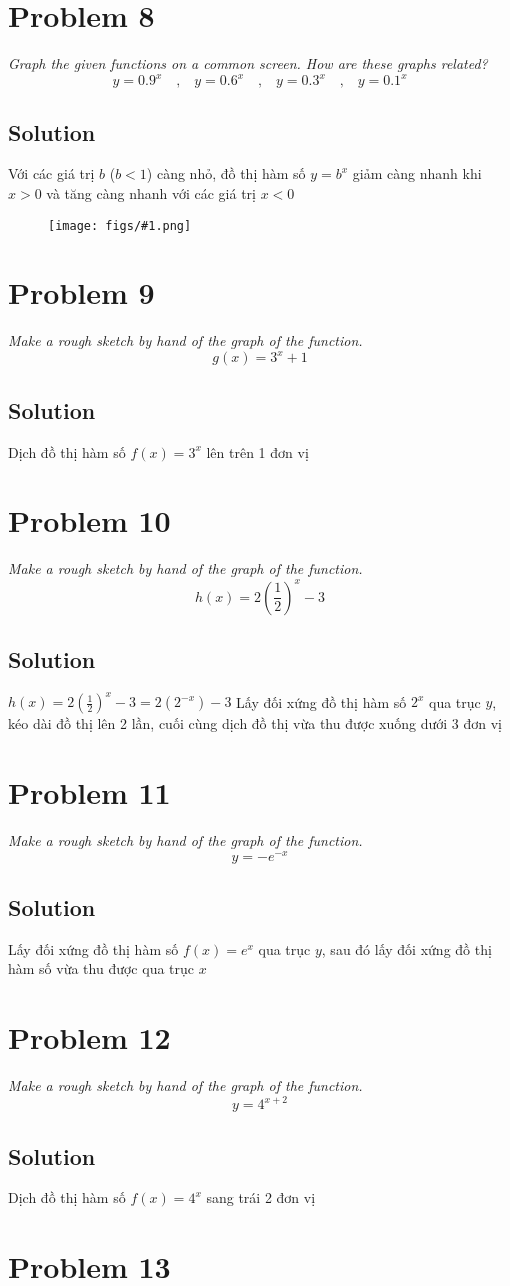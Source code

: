 \documentclass[11pt]{article}
\newcommand{\soln}{\subsection*}
\newcommand{\qn}{\textit}
\newcommand{\imgsoln}[1]{
	\begin{figure}[H]
		\centering
		\texttt{[image: figs/\#1.png]}
	\end{figure}
}
\newcommand{\eqtext}[1]{\quad\text{#1}\quad}
\begin{document}
\section*{Problem 8}

\qn{Graph the given functions on a common screen. How are these graphs related? $$y=0.9^x \eqtext{,} y=0.6^x \eqtext{,} y=0.3^x \eqtext{,} y=0.1^x$$}

\soln{Solution}
Với các giá trị $b$ ($b<1$) càng nhỏ, đồ thị hàm số $y=b^x$ giảm càng nhanh khi $x>0$ và tăng càng nhanh với các giá trị $x<0$
\imgsoln{1.4.5-ans}

\section*{Problem 9}

\qn{Make a rough sketch by hand of the graph of the function. $$g(x)=3^x+1$$}

\soln{Solution}
Dịch đồ thị hàm số $f(x)=3^x$ lên trên 1 đơn vị

\section*{Problem 10}

\qn{Make a rough sketch by hand of the graph of the function. $$h(x)=2(\frac{1}{2})^x-3$$}

\soln{Solution}
$h(x)=2(\frac{1}{2})^x-3=2(2^{-x})-3$ Lấy đối xứng đồ thị hàm số $2^x$ qua trục $y$, kéo dài đồ thị lên 2 lần, cuối cùng dịch đồ thị vừa thu được xuống dưới 3 đơn vị

\section*{Problem 11}

\qn{Make a rough sketch by hand of the graph of the function. $$y=-e^{-x}$$}

\soln{Solution}
Lấy đối xứng đồ thị hàm số $f(x)=e^x$ qua trục $y$, sau đó lấy đối xứng đồ thị hàm số vừa thu được qua trục $x$

\section*{Problem 12}

\qn{Make a rough sketch by hand of the graph of the function. $$y=4^{x+2}$$}

\soln{Solution}
Dịch đồ thị hàm số $f(x)=4^x$ sang trái 2 đơn vị

\section*{Problem 13}
\end{document}
